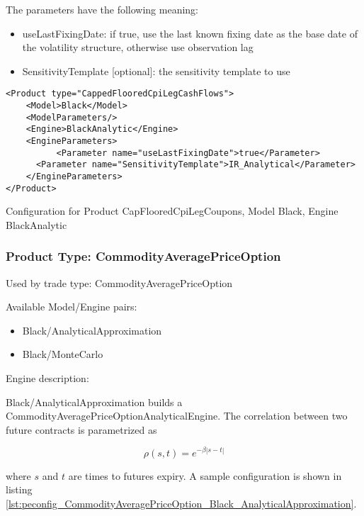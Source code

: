 The parameters have the following meaning:

\begin{itemize}
\item useLastFixingDate: if true, use the last known fixing date as the base date of the volatility structure, otherwise
  use observation lag        
\item SensitivityTemplate [optional]: the sensitivity template to use 
\end{itemize}

\begin{longlisting}
\begin{verbatim}
<Product type="CappedFlooredCpiLegCashFlows">
    <Model>Black</Model>
    <ModelParameters/>
    <Engine>BlackAnalytic</Engine>
    <EngineParameters>
          <Parameter name="useLastFixingDate">true</Parameter>
      <Parameter name="SensitivityTemplate">IR_Analytical</Parameter>
    </EngineParameters>
</Product>
\end{verbatim}
\caption{Configuration for Product CapFlooredCpiLegCoupons, Model Black, Engine BlackAnalytic}
\label{lst:peconfig_CappedFlooredCpiLegCashFlows_Black_BlackAnalytic}
\end{longlisting}

\subsubsection{Product Type: CommodityAveragePriceOption}

Used by trade type: CommodityAveragePriceOption

Available Model/Engine pairs:

\begin{itemize}
\item Black/AnalyticalApproximation
\item Black/MonteCarlo
\end{itemize}

Engine description:

Black/AnalyticalApproximation builds a CommodityAveragePriceOptionAnalyticalEngine. The correlation between two future
contracts is parametrized as

$$\rho(s, t) = e^{-\beta |s-t|}$$

where $s$ and $t$ are times to futures expiry. A sample configuration is shown in listing
\ref{lst:peconfig_CommodityAveragePriceOption_Black_AnalyticalApproximation}.

